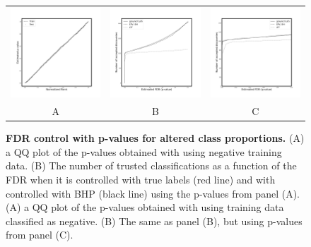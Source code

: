 \documentclass{article}
\begin{document}
\begin{figure}
    \centering
        \begin{tabular}{ccc}
 		\includegraphics[width=2in]{img/cnn_QQ_balanced.png} &
		\includegraphics[width=2in]{img/cnn_balanced_fdr_control.png} & 
            \includegraphics[width=2in]{img/cnn_balanced_fdr_control_loc.png}
		\\	
		A & B & C
	\end{tabular}
	\caption{{\bf  FDR control with p-values for altered class proportions.}
		(A) a QQ plot of the p-values obtained with using negative training data. (B) The number of trusted classifications as a function of the FDR when it is controlled with true labels (red line) and with controlled with BHP (black line) using the p-values from panel (A).
		(A) a QQ plot of the p-values obtained with using training data classified as negative. (B) The same as panel (B), but using p-values from panel (C).
	}
	\label{fig:balanced}
\end{figure}
\end{document}
